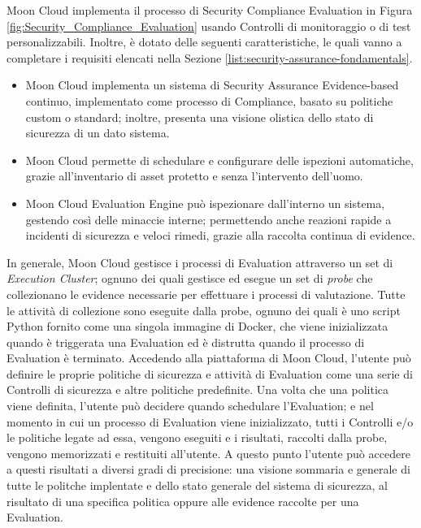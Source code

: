 \hfill\break
\break
Moon Cloud implementa il processo di Security Compliance Evaluation in Figura \ref{fig:Security_Compliance_Evaluation} usando Controlli 
di monitoraggio o di test personalizzabili. Inoltre, è dotato delle seguenti caratteristiche, le quali vanno a completare i requisiti 
elencati nella Sezione \ref{list:security-assurance-fondamentals}.
\begin{itemize}
    \item Moon Cloud implementa un sistema di Security Assurance Evidence-based continuo, implementato come processo di Compliance,
    basato su politiche custom o standard; inoltre, presenta una visione olistica dello stato di sicurezza di un dato sistema.
    \item Moon Cloud permette di schedulare e configurare delle ispezioni automatiche, grazie all'inventario di asset protetto e senza
    l'intervento dell'uomo.
    \item Moon Cloud Evaluation Engine può ispezionare dall'interno un sistema, gestendo così delle minaccie interne; permettendo anche 
    reazioni rapide a incidenti di sicurezza e veloci rimedi, grazie alla raccolta continua di evidence.
\end{itemize}
In generale, Moon Cloud gestisce i processi di Evaluation attraverso un set di \textit{Execution Cluster}; ognuno dei quali gestisce 
ed esegue un set di \textit{probe} che collezionano le evidence necessarie per effettuare i processi di valutazione. 
Tutte le attività di collezione sono eseguite dalla probe, ognuno dei quali è uno script Python fornito come una singola immagine di Docker, 
che viene inizializzata quando è triggerata una Evaluation ed è distrutta quando il processo di Evaluation è terminato.\hfill\break
Accedendo alla piattaforma di Moon Cloud, l'utente può definire le proprie politiche di sicurezza e attività di Evaluation come 
una serie di Controlli di sicurezza e altre politiche predefinite. Una volta che una politica viene definita, l'utente può 
decidere quando schedulare l'Evaluation; e nel momento in cui un processo di Evaluation viene inizializzato, tutti i Controlli e/o le 
politiche legate ad essa, vengono eseguiti e i risultati, raccolti dalla probe, vengono memorizzati e restituiti all'utente. 
A questo punto l'utente può accedere a questi risultati a diversi gradi di precisione: una visione sommaria e generale di tutte le 
politche implentate e dello stato generale del sistema di sicurezza, al risultato di una specifica politica oppure alle evidence 
raccolte per una Evaluation.
\vspace{0.5 cm}

